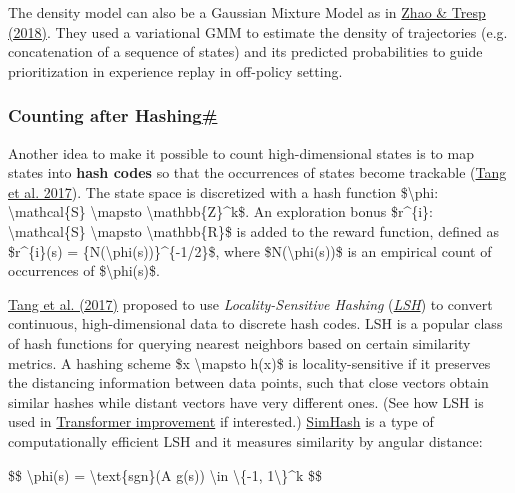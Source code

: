 The density model can also be a Gaussian Mixture Model as in \href{https://arxiv.org/abs/1902.08039}{Zhao \& Tresp (2018)}. They used a variational GMM to estimate the density of trajectories (e.g. concatenation of a sequence of states) and its predicted probabilities to guide prioritization in experience replay in off-policy setting.

\subsubsection{\texorpdfstring{Counting after Hashing\hyperref[counting-after-hashing]{\#}}{Counting after Hashing\#}}\label{counting-after-hashing}

Another idea to make it possible to count high-dimensional states is to map states into \textbf{hash codes} so that the occurrences of states become trackable (\href{https://arxiv.org/abs/1611.04717}{Tang et al. 2017}). The state space is discretized with a hash function \$\textbackslash phi: \textbackslash mathcal\{S\} \textbackslash mapsto \textbackslash mathbb\{Z\}\^{}k\$. An exploration bonus \$r\^{}\{i\}: \textbackslash mathcal\{S\} \textbackslash mapsto \textbackslash mathbb\{R\}\$ is added to the reward function, defined as \$r\^{}\{i\}(s) = \{N(\textbackslash phi(s))\}\^{}\{-1/2\}\$, where \$N(\textbackslash phi(s))\$ is an empirical count of occurrences of \$\textbackslash phi(s)\$.

\href{https://arxiv.org/abs/1611.04717}{Tang et al. (2017)} proposed to use \emph{Locality-Sensitive Hashing} (\href{https://en.wikipedia.org/wiki/Locality-sensitive_hashing}{\emph{LSH}}) to convert continuous, high-dimensional data to discrete hash codes. LSH is a popular class of hash functions for querying nearest neighbors based on certain similarity metrics. A hashing scheme \$x \textbackslash mapsto h(x)\$ is locality-sensitive if it preserves the distancing information between data points, such that close vectors obtain similar hashes while distant vectors have very different ones. (See how LSH is used in \href{https://lilianweng.github.io/posts/2020-04-07-the-transformer-family/\#LSH}{Transformer improvement} if interested.) \href{https://www.cs.princeton.edu/courses/archive/spr04/cos598B/bib/CharikarEstim.pdf}{SimHash} is a type of computationally efficient LSH and it measures similarity by angular distance:

\$\$ \textbackslash phi(s) = \textbackslash text\{sgn\}(A g(s)) \textbackslash in \textbackslash\{-1, 1\textbackslash\}\^{}k \$\$

